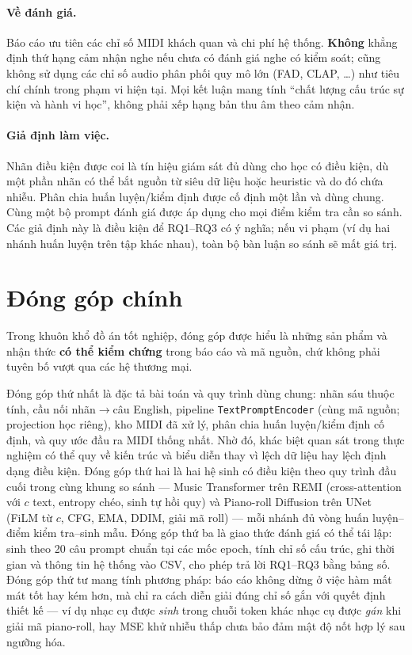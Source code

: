 \paragraph{Về đánh giá.}
Báo cáo ưu tiên các chỉ số MIDI khách quan và chi phí hệ thống. \textbf{Không} khẳng định thứ hạng cảm nhận nghe nếu chưa có đánh giá nghe có kiểm soát; cũng không sử dụng các chỉ số audio phân phối quy mô lớn (FAD, CLAP, \ldots) như tiêu chí chính trong phạm vi hiện tại. Mọi kết luận mang tính ``chất lượng cấu trúc sự kiện và hành vi học'', không phải xếp hạng bản thu âm theo cảm nhận.

\paragraph{Giả định làm việc.}
Nhãn điều kiện được coi là tín hiệu giám sát đủ dùng cho học có điều kiện, dù một phần nhãn có thể bắt nguồn từ siêu dữ liệu hoặc heuristic và do đó chứa nhiễu. Phân chia huấn luyện/kiểm định được cố định một lần và dùng chung. Cùng một bộ prompt đánh giá được áp dụng cho mọi điểm kiểm tra cần so sánh. Các giả định này là điều kiện để RQ1--RQ3 có ý nghĩa; nếu vi phạm (ví dụ hai nhánh huấn luyện trên tập khác nhau), toàn bộ bàn luận so sánh sẽ mất giá trị.

\section{Đóng góp chính}
\label{sec:ch1-contributions}

Trong khuôn khổ đồ án tốt nghiệp, đóng góp được hiểu là những sản phẩm và nhận thức \textbf{có thể kiểm chứng} trong báo cáo và mã nguồn, chứ không phải tuyên bố vượt qua các hệ thương mại.

Đóng góp thứ nhất là đặc tả bài toán và quy trình dùng chung: nhãn sáu thuộc tính, cầu nối nhãn$\rightarrow$câu English, pipeline \texttt{TextPromptEncoder} (cùng mã nguồn; projection học riêng), kho MIDI đã xử lý, phân chia huấn luyện/kiểm định cố định, và quy ước đầu ra MIDI thống nhất. Nhờ đó, khác biệt quan sát trong thực nghiệm có thể quy về kiến trúc và biểu diễn thay vì lệch dữ liệu hay lệch định dạng điều kiện. Đóng góp thứ hai là hai hệ sinh có điều kiện theo quy trình đầu cuối trong cùng khung so sánh --- Music Transformer trên REMI (cross-attention với $c$ text, entropy chéo, sinh tự hồi quy) và Piano-roll Diffusion trên UNet (FiLM từ $c$, CFG, EMA, DDIM, giải mã roll) --- mỗi nhánh đủ vòng huấn luyện--điểm kiểm tra--sinh mẫu. Đóng góp thứ ba là giao thức đánh giá có thể tái lập: sinh theo 20 câu prompt chuẩn tại các mốc epoch, tính chỉ số cấu trúc, ghi thời gian và thông tin hệ thống vào CSV, cho phép trả lời RQ1--RQ3 bằng bảng số. Đóng góp thứ tư mang tính phương pháp: báo cáo không dừng ở việc hàm mất mát tốt hay kém hơn, mà chỉ ra cách diễn giải đúng chỉ số gắn với quyết định thiết kế --- ví dụ nhạc cụ được \textit{sinh} trong chuỗi token khác nhạc cụ được \textit{gán} khi giải mã piano-roll, hay MSE khử nhiễu thấp chưa bảo đảm mật độ nốt hợp lý sau ngưỡng hóa.

